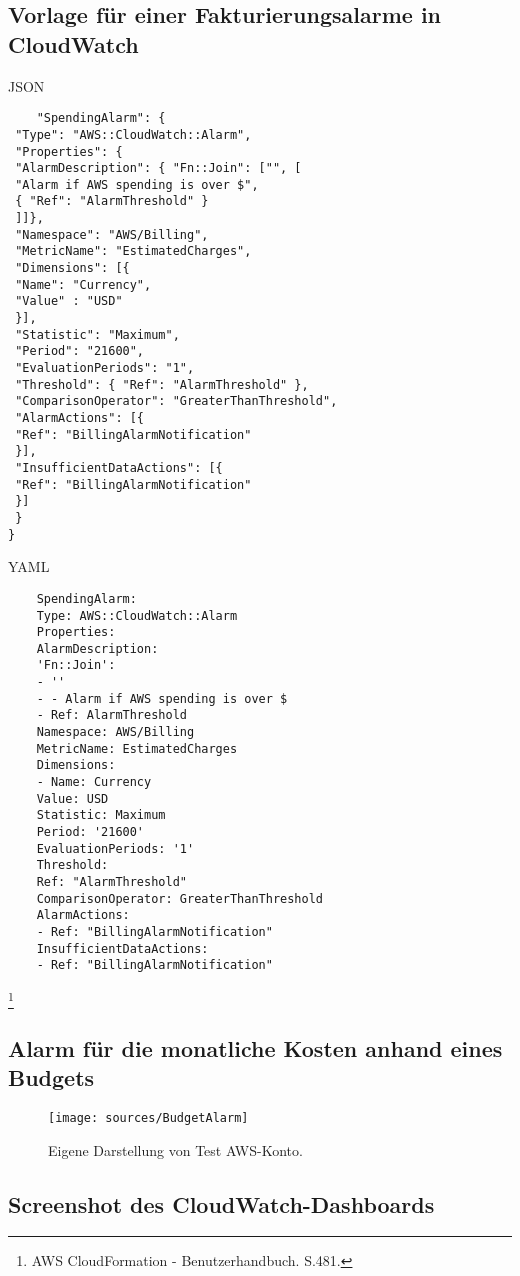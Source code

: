 \appendix
\renewcommand{\thesubsection}{\Roman{subsection}}
\subsection{Vorlage für einer Fakturierungsalarme in CloudWatch}\label{sec_Ang_A}
JSON\\
\begin{lstlisting}
    "SpendingAlarm": {
 "Type": "AWS::CloudWatch::Alarm",
 "Properties": {
 "AlarmDescription": { "Fn::Join": ["", [
 "Alarm if AWS spending is over $",
 { "Ref": "AlarmThreshold" }
 ]]},
 "Namespace": "AWS/Billing",
 "MetricName": "EstimatedCharges",
 "Dimensions": [{
 "Name": "Currency",
 "Value" : "USD"
 }],
 "Statistic": "Maximum",
 "Period": "21600",
 "EvaluationPeriods": "1",
 "Threshold": { "Ref": "AlarmThreshold" },
 "ComparisonOperator": "GreaterThanThreshold",
 "AlarmActions": [{
 "Ref": "BillingAlarmNotification"
 }],
 "InsufficientDataActions": [{
 "Ref": "BillingAlarmNotification"
 }]
 }
}
\end{lstlisting}

YAML
\\
\begin{lstlisting}
    SpendingAlarm:
    Type: AWS::CloudWatch::Alarm
    Properties:
    AlarmDescription:
    'Fn::Join':
    - ''
    - - Alarm if AWS spending is over $
    - Ref: AlarmThreshold
    Namespace: AWS/Billing
    MetricName: EstimatedCharges
    Dimensions:
    - Name: Currency
    Value: USD
    Statistic: Maximum
    Period: '21600'
    EvaluationPeriods: '1'
    Threshold:
    Ref: "AlarmThreshold"
    ComparisonOperator: GreaterThanThreshold
    AlarmActions:
    - Ref: "BillingAlarmNotification"
    InsufficientDataActions:
    - Ref: "BillingAlarmNotification"
\end{lstlisting}
\footnote{AWS CloudFormation - Benutzerhandbuch. S.481.\cite{AMZ32}}

\subsection{Alarm für die monatliche Kosten anhand eines Budgets}\label{sec_Ang_B}
\begin{figure}[h!]
    \centering
    \texttt{[image: sources/BudgetAlarm]}
    \caption[Budgetalarm]{}
    \label{fig:CloudWatchDashboardTest} 
    Eigene Darstellung von Test AWS-Konto.
  \end{figure}

  \subsection{Screenshot des CloudWatch-Dashboards}\label{sec_Ang_C}
